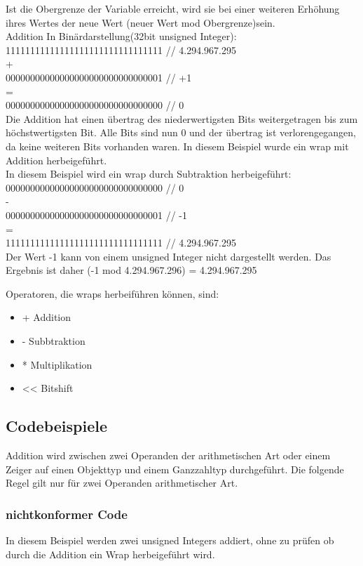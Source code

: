 \documentclass[12pt]{article}
\begin{document}
Ist die Obergrenze der Variable erreicht, wird sie bei einer weiteren Erh\"ohung ihres Wertes der neue Wert (neuer Wert mod Obergrenze)sein.\\
Addition In Bin\"ardarstellung(32bit unsigned Integer):\\
11111111111111111111111111111111  // 4.294.967.295\\
+\\
00000000000000000000000000000001  // +1\\
=\\
00000000000000000000000000000000  // 0\\
Die Addition hat einen \"ubertrag des niederwertigsten Bits weitergetragen bis zum h\"ochstwertigsten Bit. Alle Bits sind nun 0 und der \"ubertrag ist verlorengegangen, da keine weiteren Bits vorhanden waren. In diesem Beispiel wurde ein wrap mit Addition herbeigef\"uhrt. \\
In diesem Beispiel wird ein wrap durch Subtraktion herbeigef\"uhrt:\\
00000000000000000000000000000000 // 0\\
-\\
00000000000000000000000000000001 // -1\\
=\\
11111111111111111111111111111111 // 4.294.967.295\\

Der Wert -1 kann von einem unsigned Integer nicht dargestellt werden. Das Ergebnis ist daher (-1 mod 4.294.967.296) = 4.294.967.295

Operatoren, die wraps herbeif\"uhren k\"onnen, sind:
\begin{itemize}
    \item + Addition
    \item - Subbtraktion
    \item * Multiplikation
    \item << Bitshift
\end{itemize}
\subsection{Codebeispiele}
Addition wird zwischen zwei Operanden der arithmetischen Art oder einem Zeiger auf einen Objekttyp und einem Ganzzahltyp durchgef\"uhrt. Die folgende Regel gilt nur f\"ur zwei Operanden arithmetischer Art.
\subsubsection{nichtkonformer Code}

In diesem Beispiel werden zwei unsigned Integers addiert, ohne zu pr\"ufen ob durch die Addition ein Wrap herbeigef\"uhrt wird.
\end{document}

